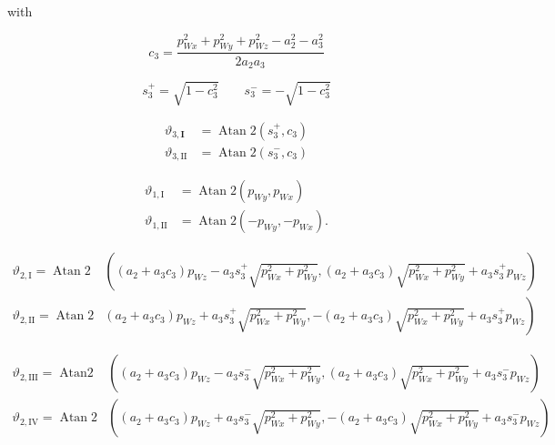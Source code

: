 \documentclass[10pt]{article}
\begin{document}
with 

$$
c_{3}=\frac{p_{W x}^{2}+p_{W y}^{2}+p_{W z}^{2}-a_{2}^{2}-a_{3}^{2}}{2 a_{2} a_{3}}
$$



$$
s_{3}^+= \sqrt{1-c_{3}^{2}}\quad\quad s_{3}^-= -\sqrt{1-c_{3}^{2}}
$$



$$
\begin{aligned}
\vartheta_{3, \mathbf{I}}&=\operatorname{Atan} 2 \left( s_3^{+}, c_{3}\right)\\
\vartheta_{3, \mathrm{II}} & =\operatorname{Atan} 2 \left( s_3^{-}, c_{3}\right)
\end{aligned}
$$



$$
\begin{aligned}
\vartheta_{1, \mathrm{I}} & =\operatorname{Atan} 2\left(p_{W y}, p_{W x}\right) \\
\vartheta_{1, \mathrm{II}} & =\operatorname{Atan} 2\left(-p_{W y},-p_{W x}\right) .
\end{aligned}
$$


$$
\begin{aligned}
\vartheta_{2, \mathrm{I}}=\operatorname{Atan} 2 & \left(\left(a_{2}+a_{3} c_{3}\right) p_{W z}-a_{3} s_{3}^{+} \sqrt{p_{W x}^{2}+p_{W y}^{2}},\right. 
\left.\left(a_{2}+a_{3} c_{3}\right) \sqrt{p_{W x}^{2}+p_{W y}^{2}}+a_{3} s_{3}^{+} p_{W z}\right) \\
\vartheta_{2, \mathrm{II}}=\operatorname{Atan} 2 & \left(a_{2}+a_{3} c_{3}\right) p_{W z}+a_{3} s_{3}^{+} \sqrt{p_{W x}^{2}+p_{W y}^{2}},  \left.-\left(a_{2}+a_{3} c_{3}\right) \sqrt{p_{W x}^{2}+p_{W y}^{2}}+a_{3} s_{3}^{+} p_{W z}\right)
\end{aligned}
$$


$$
\begin{aligned}
\vartheta_{2, \mathrm{III}}=\operatorname{Atan2} & \left(\left(a_{2}+a_{3} c_{3}\right) p_{W z}-a_{3} s_{3}^{-} \sqrt{p_{W x}^{2}+p_{W y}^{2}},\right.  \left.\left(a_{2}+a_{3} c_{3}\right) \sqrt{p_{W x}^{2}+p_{W y}^{2}}+a_{3} s_{3}^{-} p_{W z}\right) \\
\vartheta_{2, \mathrm{IV}}=\operatorname{Atan} 2 & \left(\left(a_{2}+a_{3} c_{3}\right) p_{W z}+a_{3} s_{3}^{-} \sqrt{p_{W x}^{2}+p_{W y}^{2}},\right.  \left.-\left(a_{2}+a_{3} c_{3}\right) \sqrt{p_{W x}^{2}+p_{W y}^{2}}+a_{3} s_{3}^{-} p_{W z}\right)
\end{aligned}
$$
\end{document}
